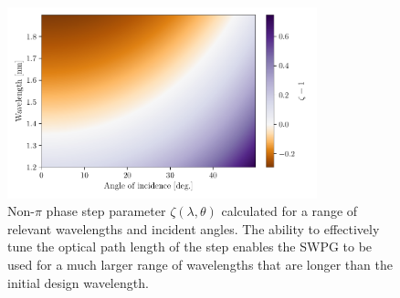 \begin{figure}
	\centering
	\includegraphics[width=0.8\textwidth]{figures/Two_source/zeta_theta.pdf}
	\caption[Non-$\pi$ phase step parameter $zeta(\lambda,\theta)$ plotted for various wavelengths and angles of incidence]{Non-$\pi$ phase step parameter $\zeta(\lambda,\theta)$ calculated for a range of relevant wavelengths and incident angles.  The ability to effectively tune the optical path length of the step enables the SWPG to be used for a much larger range of wavelengths that are longer than the initial design wavelength.}
	\label{fig:zeta_theta}
\end{figure}

